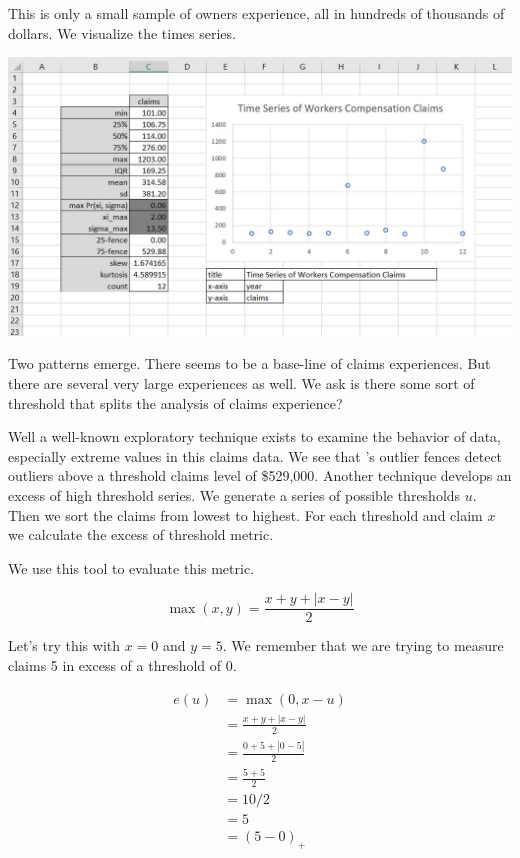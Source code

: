 \documentclass[
]{book}
\begin{document}
This is only a small sample of owners experience, all in hundreds of thousands of dollars. We visualize the times series.

\includegraphics{images/06/claims-eda.jpg}

Two patterns emerge. There seems to be a base-line of claims experiences. But there are several very large experiences as well. We ask is there some sort of threshold that splits the analysis of claims experience?

Well a well-known exploratory technique exists to examine the behavior of data, especially extreme values in this claims data. We see that \citet{Tukey1977}'s outlier fences detect outliers above a threshold claims level of \$529,000. Another technique develops an excess of high threshold series. We generate a series of possible thresholds \(u\). Then we sort the claims from lowest to highest. For each threshold and claim \(x\) we calculate the excess of threshold metric.

We use this tool to evaluate this metric.

\[
\operatorname{max}(x, y) = \frac{x+y+|x−y|}{2}
\]

Let's try this with \(x=0\) and \(y = 5\). We remember that we are trying to measure claims 5 in excess of a threshold of 0.

\[
\begin{align}
e(u) &= \operatorname{max}(0, x -  u ) \\
     &= \frac{x+y+|x−y|}{2} \\
     &= \frac{0+5+|0−5|}{2} \\
     &= \frac{5+5}{2} \\
     &= 10 / 2 \\
     &= 5 \\
     &= (5 - 0)_+ 
\end{align}
\]
\end{document}
